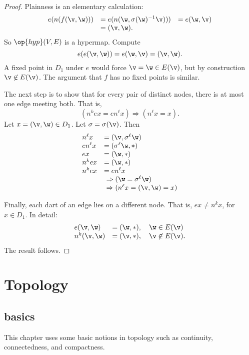 \begin{proof}  Plainness is an elementary calculation:
    $$
\begin{array}{lll}
e(n(f(\v,\w))) &= e(n(\w,\sigma(\w)^{-1} \v))) &=
        e(\w,\v)\\ 
&= (\v,\w).
\end{array}
$$
So $\op{hyp}(V,E)$ is a hypermap. Compute
    $$e(e(\v,\w)) = e(\w,\v) = (\v,\w).$$
A fixed point in $D_1$ under $e$ would force $\v = \w\in E(\v)$,
but by construction $\v\not\in E(\v)$.  The argument that $f$ has no
fixed points is similar.

The next step is to show that for every pair of distinct nodes, there is at most one edge
meeting both.
That is,
        $$(n^k e x = e n^\ell x)\Rightarrow (n^\ell x = x).$$
Let $x = (\v,\w)\in D_1$.  Let $\sigma=\sigma(\v)$. Then
    $$
    \begin{array}{lllllll}
    n^\ell x &= (\v,\sigma^\ell \w)\\
    e n^\ell x &= (\sigma^\ell \w,*)\\
    e x &= (\w,*)\\
    n^k e x &= (\w,*)\\
    n^k e x &= e n^\ell x \\&\ \Rightarrow (\w = \sigma^\ell \w) \\&\ \Rightarrow
    (n^\ell x = (\v,\w) = x)
    \end{array}
    $$

Finally,  each dart of an edge lies on a different node.
That is, $e x \ne n^k x$, for $x\in D_1$.   In detail:
    $$
    \begin{array}{lll}
        e(\v,\w) &= (\w,*),\quad \w\in E(\v)\\
        n^k(\v,\w) &= (\v,*),\quad \v\not\in E(\v).
    \end{array}
    $$
The result follows.
\end{proof}

\section{Topology}\label{sec:topology}

\subsection{basics}

This chapter uses some basic
notions in topology such as continuity, connectedness, and compactness.

